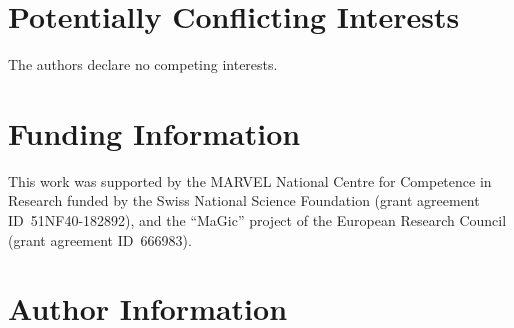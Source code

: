 \documentclass[9pt,review]{livecoms}
\begin{document}
\section{Potentially Conflicting Interests}
The authors declare no competing interests.

\section{Funding Information}
This work was supported by the MARVEL National Centre for Competence in Research funded by the Swiss National Science Foundation (grant agreement ID~51NF40-182892), 
and the ``MaGic'' project of the European Research Council (grant agreement ID~666983).

\section*{Author Information}
\makeorcid

\printbibliography
\end{document}
